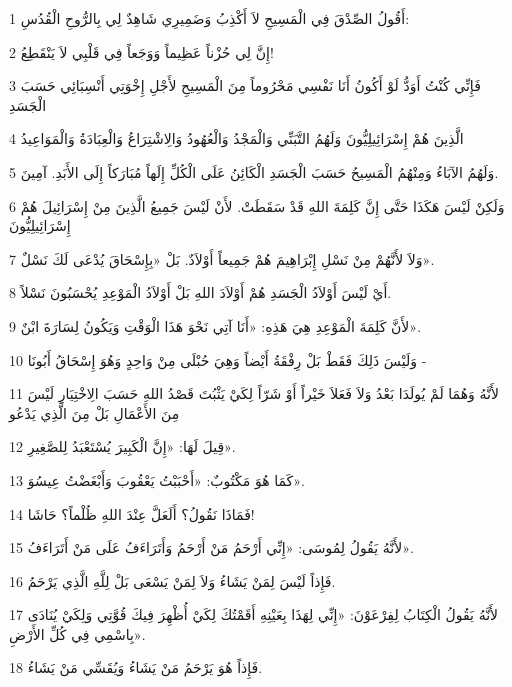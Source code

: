 \par 1 أَقُولُ الصِّدْقَ فِي الْمَسِيحِ لاَ أَكْذِبُ وَضَمِيرِي شَاهِدٌ لِي بِالرُّوحِ الْقُدُسِ:
\par 2 إِنَّ لِي حُزْناً عَظِيماً وَوَجَعاً فِي قَلْبِي لاَ يَنْقَطِعُ!
\par 3 فَإِنِّي كُنْتُ أَوَدُّ لَوْ أَكُونُ أَنَا نَفْسِي مَحْرُوماً مِنَ الْمَسِيحِ لأَجْلِ إِخْوَتِي أَنْسِبَائِي حَسَبَ الْجَسَدِ
\par 4 الَّذِينَ هُمْ إِسْرَائِيلِيُّونَ وَلَهُمُ التَّبَنِّي وَالْمَجْدُ وَالْعُهُودُ وَالِاشْتِرَاعُ وَالْعِبَادَةُ وَالْمَوَاعِيدُ
\par 5 وَلَهُمُ الآبَاءُ وَمِنْهُمُ الْمَسِيحُ حَسَبَ الْجَسَدِ الْكَائِنُ عَلَى الْكُلِّ إِلَهاً مُبَارَكاً إِلَى الأَبَدِ. آمِينَ.
\par 6 وَلَكِنْ لَيْسَ هَكَذَا حَتَّى إِنَّ كَلِمَةَ اللهِ قَدْ سَقَطَتْ. لأَنْ لَيْسَ جَمِيعُ الَّذِينَ مِنْ إِسْرَائِيلَ هُمْ إِسْرَائِيلِيُّونَ
\par 7 وَلاَ لأَنَّهُمْ مِنْ نَسْلِ إِبْرَاهِيمَ هُمْ جَمِيعاً أَوْلاَدٌ. بَلْ «بِإِسْحَاقَ يُدْعَى لَكَ نَسْلٌ».
\par 8 أَيْ لَيْسَ أَوْلاَدُ الْجَسَدِ هُمْ أَوْلاَدَ اللهِ بَلْ أَوْلاَدُ الْمَوْعِدِ يُحْسَبُونَ نَسْلاً.
\par 9 لأَنَّ كَلِمَةَ الْمَوْعِدِ هِيَ هَذِهِ: «أَنَا آتِي نَحْوَ هَذَا الْوَقْتِ وَيَكُونُ لِسَارَةَ ابْنٌ».
\par 10 وَلَيْسَ ذَلِكَ فَقَطْ بَلْ رِفْقَةُ أَيْضاً وَهِيَ حُبْلَى مِنْ وَاحِدٍ وَهُوَ إِسْحَاقُ أَبُونَا -
\par 11 لأَنَّهُ وَهُمَا لَمْ يُولَدَا بَعْدُ وَلاَ فَعَلاَ خَيْراً أَوْ شَرّاً لِكَيْ يَثْبُتَ قَصْدُ اللهِ حَسَبَ الِاخْتِيَارِ لَيْسَ مِنَ الأَعْمَالِ بَلْ مِنَ الَّذِي يَدْعُو
\par 12 قِيلَ لَهَا: «إِنَّ الْكَبِيرَ يُسْتَعْبَدُ لِلصَّغِيرِ».
\par 13 كَمَا هُوَ مَكْتُوبٌ: «أَحْبَبْتُ يَعْقُوبَ وَأَبْغَضْتُ عِيسُوَ».
\par 14 فَمَاذَا نَقُولُ؟ أَلَعَلَّ عِنْدَ اللهِ ظُلْماً؟ حَاشَا!
\par 15 لأَنَّهُ يَقُولُ لِمُوسَى: «إِنِّي أَرْحَمُ مَنْ أَرْحَمُ وَأَتَرَاءَفُ عَلَى مَنْ أَتَرَاءَفُ».
\par 16 فَإِذاً لَيْسَ لِمَنْ يَشَاءُ وَلاَ لِمَنْ يَسْعَى بَلْ لِلَّهِ الَّذِي يَرْحَمُ.
\par 17 لأَنَّهُ يَقُولُ الْكِتَابُ لِفِرْعَوْنَ: «إِنِّي لِهَذَا بِعَيْنِهِ أَقَمْتُكَ لِكَيْ أُظْهِرَ فِيكَ قُوَّتِي وَلِكَيْ يُنَادَى بِاسْمِي فِي كُلِّ الأَرْضِ».
\par 18 فَإِذاً هُوَ يَرْحَمُ مَنْ يَشَاءُ وَيُقَسِّي مَنْ يَشَاءُ.
